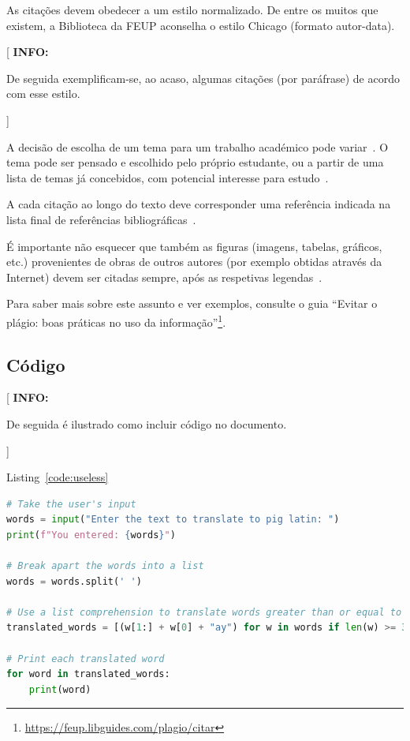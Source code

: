 \documentclass[11pt,a4paper]{report}
\newenvironment{info}[1]{\vspace*{6mm}\color{blue}[ \textbf{INFO:} \begin{em} #1}
                        {\vspace*{3mm}\end{em} ]}
\begin{document}
As citações devem obedecer a um estilo normalizado.
De entre os muitos que existem, a Biblioteca da FEUP aconselha o
estilo Chicago (formato autor-data).

\begin{info}
De seguida exemplificam-se, ao acaso, algumas citações (por paráfrase)
de acordo com esse estilo.
\end{info}

A decisão de escolha de um tema para um trabalho académico pode
variar~\cite{kn:Bel02-book}.
O tema pode ser pensado e escolhido pelo próprio estudante, ou a
partir de uma lista de temas já concebidos, com potencial interesse
para estudo~\cite{kn:GLPR14-joPhysics}.

A cada citação ao longo do texto deve corresponder uma referência
indicada na lista final de referências
bibliográficas~\cite{kn:Lip08,kn:MSS+12-wemep,kn:VKL+18-dtu}. 

É importante não esquecer que também as figuras (imagens, tabelas,
gráficos, etc.) provenientes de obras de outros autores (por exemplo 
obtidas através da Internet) devem ser citadas sempre, após as
respetivas legendas~\cite{kn:GLPC22-torque}.

Para saber mais sobre este assunto e ver exemplos, consulte o guia
``Evitar o plágio: boas práticas no uso da
informação''\footnote{\url{https://feup.libguides.com/plagio/citar}}.  

\lipsum[7]

\subsection*{Código}

\begin{info}
De seguida é ilustrado como incluir código no documento.
\end{info}

Listing~\ref{code:useless} 
\lipsum[8]

\begin{lstlisting}[language=Python, caption=Python example, label=code:useless]
# Take the user's input
words = input("Enter the text to translate to pig latin: ")
print(f"You entered: {words}")

# Break apart the words into a list
words = words.split(' ')

# Use a list comprehension to translate words greater than or equal to 3 characters
translated_words = [(w[1:] + w[0] + "ay") for w in words if len(w) >= 3 ]

# Print each translated word
for word in translated_words:
    print(word)
\end{lstlisting}
\end{document}
